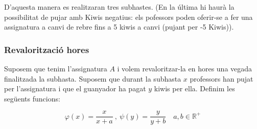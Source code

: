 \documentclass[10pt,twocolumn]{article}
\begin{document}
D'aquesta manera es realitzaran tres subhastes. (En la última hi haurà la possibilitat de pujar amb Kiwis negatius: els pofessors poden oferir-se a fer una assignatura a canvi de rebre fins a 5 kiwis a canvi (pujant per -5 Kiwis)).

\subsubsection{Revalorització hores}

Suposem que tenim l'assignatura $A$ i volem revaloritzar-la en hores una vegada finalitzada la subhasta.
Suposem que durant la subhasta $x$ professors han pujat per l'assignatura i que el guanyador ha pagat $y$ kiwis per ella. Definim les següents funcions:

$$\varphi (x)=\frac{x}{x+a}\ ,\  \psi(y)=\frac{y}{y+b} \quad a,b\in\mathbb{R}^{+} $$
	
\end{document}
